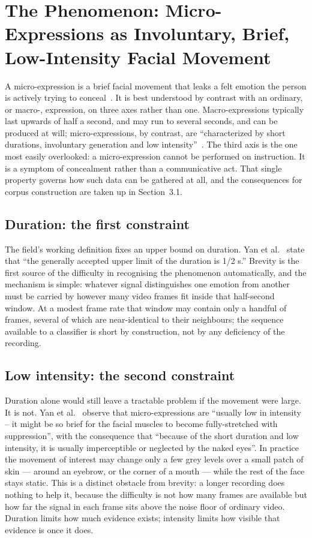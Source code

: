 \section{The Phenomenon: Micro-Expressions as Involuntary, Brief, Low-Intensity Facial Movement}
\label{sec:phenomenon}

A micro-expression is a brief facial movement that leaks a felt emotion the person is actively trying to conceal~\cite{yan2014}. It is best understood by contrast with an ordinary, or macro-, expression, on three axes rather than one. Macro-expressions typically last upwards of half a second, and may run to several seconds, and can be produced at will; micro-expressions, by contrast, are ``characterized by short durations, involuntary generation and low intensity''~\cite{qu2016}. The third axis is the one most easily overlooked: a micro-expression cannot be performed on instruction. It is a symptom of concealment rather than a communicative act. That single property governs how such data can be gathered at all, and the consequences for corpus construction are taken up in Section~3.1.

\subsection{Duration: the first constraint}
\label{sec:duration}

The field's working definition fixes an upper bound on duration. Yan et al.~\cite{yan2014} state that ``the generally accepted upper limit of the duration is 1/2 s.'' Brevity is the first source of the difficulty in recognising the phenomenon automatically, and the mechanism is simple: whatever signal distinguishes one emotion from another must be carried by however many video frames fit inside that half-second window. At a modest frame rate that window may contain only a handful of frames, several of which are near-identical to their neighbours; the sequence available to a classifier is short by construction, not by any deficiency of the recording.

\subsection{Low intensity: the second constraint}
\label{sec:low-intensity}

Duration alone would still leave a tractable problem if the movement were large. It is not. Yan et al.~\cite{yan2014} observe that micro-expressions are ``usually low in intensity -- it might be so brief for the facial muscles to become fully-stretched with suppression'', with the consequence that ``because of the short duration and low intensity, it is usually imperceptible or neglected by the naked eyes''. In practice the movement of interest may change only a few grey levels over a small patch of skin --- around an eyebrow, or the corner of a mouth --- while the rest of the face stays static. This is a distinct obstacle from brevity: a longer recording does nothing to help it, because the difficulty is not how many frames are available but how far the signal in each frame sits above the noise floor of ordinary video. Duration limits how much evidence exists; intensity limits how visible that evidence is once it does.

